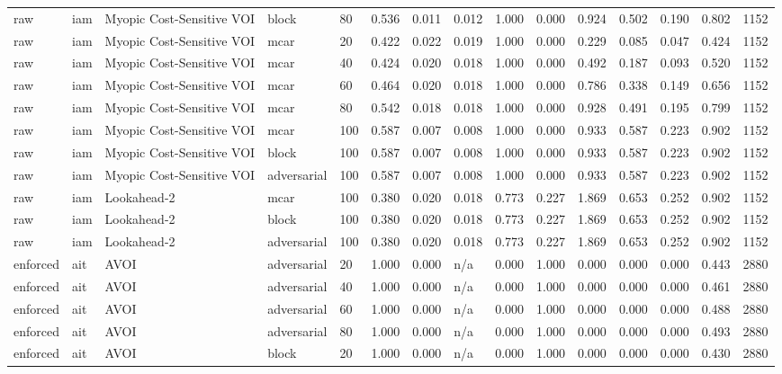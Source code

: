 \begin{table}[!ht]
{\begin{tabular}{lllllllllllllll}
raw & iam & Myopic Cost-Sensitive VOI & block & 80 & 0.536 & 0.011 & 0.012 & 1.000 & 0.000 & 0.924 & 0.502 & 0.190 & 0.802 & 1152 \\
raw & iam & Myopic Cost-Sensitive VOI & mcar & 20 & 0.422 & 0.022 & 0.019 & 1.000 & 0.000 & 0.229 & 0.085 & 0.047 & 0.424 & 1152 \\
raw & iam & Myopic Cost-Sensitive VOI & mcar & 40 & 0.424 & 0.020 & 0.018 & 1.000 & 0.000 & 0.492 & 0.187 & 0.093 & 0.520 & 1152 \\
raw & iam & Myopic Cost-Sensitive VOI & mcar & 60 & 0.464 & 0.020 & 0.018 & 1.000 & 0.000 & 0.786 & 0.338 & 0.149 & 0.656 & 1152 \\
raw & iam & Myopic Cost-Sensitive VOI & mcar & 80 & 0.542 & 0.018 & 0.018 & 1.000 & 0.000 & 0.928 & 0.491 & 0.195 & 0.799 & 1152 \\
raw & iam & Myopic Cost-Sensitive VOI & mcar & 100 & 0.587 & 0.007 & 0.008 & 1.000 & 0.000 & 0.933 & 0.587 & 0.223 & 0.902 & 1152 \\
raw & iam & Myopic Cost-Sensitive VOI & block & 100 & 0.587 & 0.007 & 0.008 & 1.000 & 0.000 & 0.933 & 0.587 & 0.223 & 0.902 & 1152 \\
raw & iam & Myopic Cost-Sensitive VOI & adversarial & 100 & 0.587 & 0.007 & 0.008 & 1.000 & 0.000 & 0.933 & 0.587 & 0.223 & 0.902 & 1152 \\
raw & iam & Lookahead-2 & mcar & 100 & 0.380 & 0.020 & 0.018 & 0.773 & 0.227 & 1.869 & 0.653 & 0.252 & 0.902 & 1152 \\
raw & iam & Lookahead-2 & block & 100 & 0.380 & 0.020 & 0.018 & 0.773 & 0.227 & 1.869 & 0.653 & 0.252 & 0.902 & 1152 \\
raw & iam & Lookahead-2 & adversarial & 100 & 0.380 & 0.020 & 0.018 & 0.773 & 0.227 & 1.869 & 0.653 & 0.252 & 0.902 & 1152 \\
enforced & ait & AVOI & adversarial & 20 & 1.000 & 0.000 & n/a & 0.000 & 1.000 & 0.000 & 0.000 & 0.000 & 0.443 & 2880 \\
enforced & ait & AVOI & adversarial & 40 & 1.000 & 0.000 & n/a & 0.000 & 1.000 & 0.000 & 0.000 & 0.000 & 0.461 & 2880 \\
enforced & ait & AVOI & adversarial & 60 & 1.000 & 0.000 & n/a & 0.000 & 1.000 & 0.000 & 0.000 & 0.000 & 0.488 & 2880 \\
enforced & ait & AVOI & adversarial & 80 & 1.000 & 0.000 & n/a & 0.000 & 1.000 & 0.000 & 0.000 & 0.000 & 0.493 & 2880 \\
enforced & ait & AVOI & block & 20 & 1.000 & 0.000 & n/a & 0.000 & 1.000 & 0.000 & 0.000 & 0.000 & 0.430 & 2880 \\

\end{tabular}}
\end{table}
